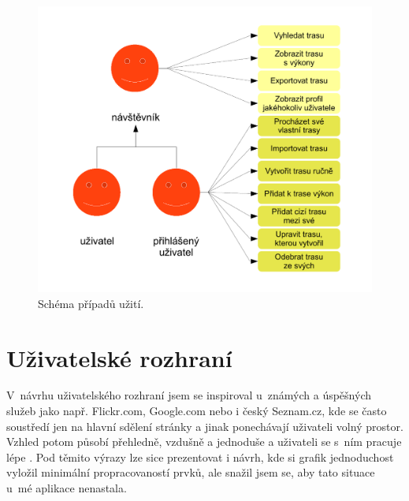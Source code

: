 \begin{figure}[h]
	\includegraphics[width=\textwidth, keepaspectratio]{fig/use-case}
	\caption{Schéma případů užití.}
	\label{obrUseCase}
\end{figure}

\section{Uživatelské rozhraní}
V~návrhu uživatelského rozhraní jsem se inspiroval u~známých a
úspěšných služeb jako např. Flickr.com, Google.com nebo i český
Seznam.cz, kde se často soustředí jen na hlavní sdělení stránky a
jinak ponechávají uživateli volný prostor. Vzhled potom působí
přehledně, vzdušně a jednoduše a uživateli se s~ním pracuje lépe
\cite{design}. Pod těmito výrazy lze sice prezentovat i návrh, kde si
grafik jednoduchost vyložil minimální propracovaností prvků, ale
snažil jsem se, aby tato situace u~mé aplikace nenastala.

